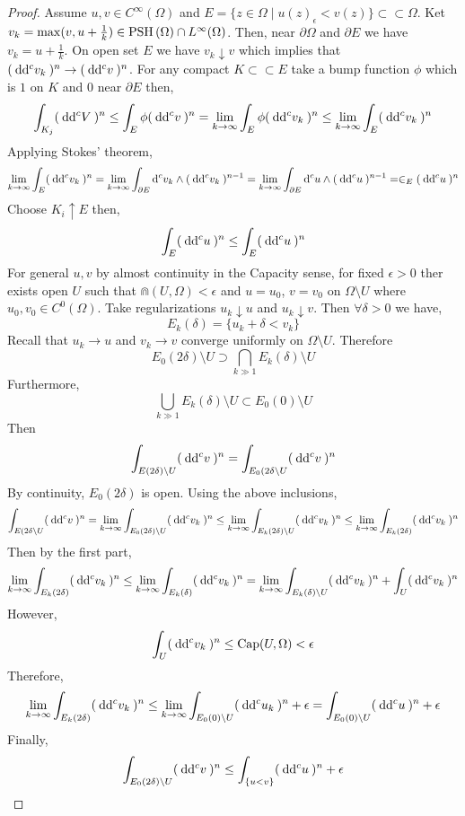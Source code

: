 \documentclass[12pt]{extarticle}
\theoremstyle{definition}
\begin{document}
\begin{proof}
Assume $u,v \in C^\infty(\Omega)$ and $E = \{ z \in \Omega \mid u(z)  _ \epsilon < v(z) \} \subset \subset \Omega$. Ket $v_k = \max(v, u + \tfrac{1}{k}) \in \mathrm{PSH}\left( \Omega \right) \cap L^\infty(\Omega)$. Then, near $\partial \Omega$ and $\partial E$ we have $v_k = u + \frac{1}{k}$. On open set $E$ we have $v_k \downarrow v$ which implies that $(\: \mathrm{d}\mathrm{d}^c{v_k} \:)^n \to (\: \mathrm{d}\mathrm{d}^c{v} \:)^n$. For any compact $K \subset \subset E$ take a bump function $\phi$ which is $1$ on $K$ and $0$ near $\partial E$ then,
\[ \int_{K_j} (\: \mathrm{d}\mathrm{d}^c{V} \:)^n \le \int_E \phi (\: \mathrm{d}\mathrm{d}^c{v} \:)^n = \lim_{k \to \infty} \int_E \phi (\: \mathrm{d}\mathrm{d}^c{v_k} \:)^n \le \lim_{k \to \infty} \int_E (\: \mathrm{d}\mathrm{d}^c{v_k} \:)^n \]
Applying Stokes' theorem,
\[ \lim_{k \to \infty} \int_E (\: \mathrm{d}\mathrm{d}^c{v_k} \:)^n = \lim_{k \to \infty} \int_{\partial E} \mathrm{d}^c{v_k} \wedge (\: \mathrm{d}\mathrm{d}^c{v_k} \:)^{n-1} = \lim_{k \to \infty} \int_{\partial E} \mathrm{d}^c{u} \wedge (\: \mathrm{d}\mathrm{d}^c{u} \:)^{n-1} = \in_E (\: \mathrm{d}\mathrm{d}^c{u} \:)^n \]
Choose $K_i \uparrow E$ then,
\[ \int_E (\: \mathrm{d}\mathrm{d}^c{u} \:)^n \le \int_E (\: \mathrm{d}\mathrm{d}^c{u} \:)^n \]
For general $u,v$ by almost continuity in the Capacity sense, for fixed $\epsilon > 0$ ther exists open $U$ such that $\Cap(U, \Omega) < \epsilon$ and $u = u_0$, $v = v_0$ on $\Omega \setminus U$ where $u_0, v_0 \in C^0(\Omega)$. Take regularizations $u_k \downarrow u$ and $u_k \downarrow v$. Then $\forall \delta > 0$ we have,
\[ E_k(\delta) = \{ u_k + \delta < v_k \} \] 
Recall that $u_k \to u$ and $v_k \to v$ converge uniformly on $\Omega \setminus U$. Therefore 
\[ E_0(2 \delta) \setminus U \supset \bigcap_{k \gg 1} E_k(\delta) \setminus U \]
Furthermore,
\[ \bigcup_{k \gg 1} E_k(\delta) \setminus U \subset E_0(0) \setminus U \]
Then 
\[ \int_{E(2 \delta) \setminus U} (\: \mathrm{d}\mathrm{d}^c{v} \:)^n = \int_{E_0(2 \delta \setminus U} (\: \mathrm{d}\mathrm{d}^c{v} \:)^n \]
By continuity, $E_0(2 \delta)$ is open. Using the above inclusions,
\[ \int_{E(2 \delta \setminus U} (\: \mathrm{d}\mathrm{d}^c{v} \:)^n = \lim_{k \to \infty} \int_{E_0(2 \delta) \setminus U} (\: \mathrm{d}\mathrm{d}^c{v_k} \:)^n \le \lim_{k \to \infty} \int_{E_k(2 \delta) \setminus U} (\: \mathrm{d}\mathrm{d}^c{v_k} \:)^n \le \lim_{k \to \infty} \int_{E_k(2 \delta)} (\: \mathrm{d}\mathrm{d}^c{v_k} \:)^n \]
Then by the first part,
\[ \lim_{k \to \infty} \int_{E_k(2 \delta)} (\: \mathrm{d}\mathrm{d}^c{v_k} \:)^n \le \lim_{k \to \infty} \int_{E_k(\delta)} (\: \mathrm{d}\mathrm{d}^c{v_k} \:)^n = \lim_{k \to \infty} \int_{E_k(\delta) \setminus U} (\: \mathrm{d}\mathrm{d}^c{v_k} \:)^n + \int_U (\: \mathrm{d}\mathrm{d}^c{v_k} \:)^n \]
However, 
\[ \int_U (\: \mathrm{d}\mathrm{d}^c{v_k} \:)^n \le \mathrm{Cap}(U, \Omega) <\epsilon \]
Therefore, 
\[ \lim_{k \to \infty} \int_{E_k(2 \delta)} (\: \mathrm{d}\mathrm{d}^c{v_k} \:)^n \le \lim_{k \to \infty} \int_{E_0(0) \setminus U} (\: \mathrm{d}\mathrm{d}^c{u_k} \:)^n + \epsilon = \int_{E_0(0) \setminus U} (\: \mathrm{d}\mathrm{d}^c{u} \:)^n + \epsilon \]
Finally,
\[ \int_{E_0(2 \delta) \setminus U} (\: \mathrm{d}\mathrm{d}^c{v} \:)^n \le \int_{\{ u < v \}} (\: \mathrm{d}\mathrm{d}^c{u} \:)^n + \epsilon \]
\end{proof}
\end{document}
